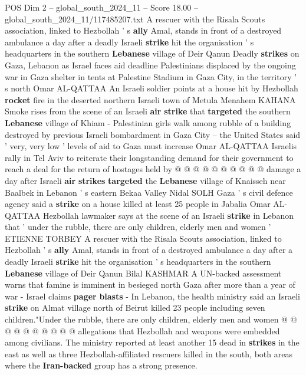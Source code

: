 \begin{textsample}{POS Dim 2 – global\_south\_2024\_11 – Score 18.00 – global\_south\_2024\_11/117485207.txt}  \label{ex:f2_pos_178}
A rescuer with the Risala Scouts association, linked to Hezbollah ' s \textbf{ally} Amal, stands in front of a destroyed ambulance a day after a deadly Israeli \textbf{strike} hit the organisation ' s headquarters in the southern \textbf{Lebanese} village of Deir Qanun Deadly \textbf{strikes} on Gaza, Lebanon as Israel faces aid deadline Palestinians displaced by the ongoing war in Gaza shelter in tents at Palestine Stadium in Gaza City, in the territory ' s north Omar AL-QATTAA An Israeli soldier points at a house hit by Hezbollah \textbf{rocket} fire in the deserted northern Israeli town of Metula Menahem KAHANA Smoke rises from the scene of an Israeli \textbf{air} \textbf{strike} that \textbf{targeted} the southern \textbf{Lebanese} village of Khiam - Palestinian girls walk among rubble of a building destroyed by previous Israeli bombardment in Gaza City -- the United States said ' very, very low ' levels of aid to Gaza must increase Omar AL-QATTAA Israelis rally in Tel Aviv to reiterate their longstanding demand for their government to reach a deal for the return of hostages held by @ @ @ @ @ @ @ @ @ @ damage a day after Israeli \textbf{air} \textbf{strikes} \textbf{targeted} the \textbf{Lebanese} village of Knaisseh near Baalbek in Lebanon ' s eastern Bekaa Valley Nidal SOLH Gaza ' s civil defence agency said a \textbf{strike} on a house killed at least 25 people in Jabalia Omar AL-QATTAA Hezbollah lawmaker says at the scene of an Israeli \textbf{strike} in Lebanon that ' under the rubble, there are only children, elderly men and women ' ETIENNE TORBEY A rescuer with the Risala Scouts association, linked to Hezbollah ' s \textbf{ally} Amal, stands in front of a destroyed ambulance a day after a deadly Israeli \textbf{strike} hit the organisation ' s headquarters in the southern \textbf{Lebanese} village of Deir Qanun Bilal KASHMAR A UN-backed assessment warns that famine is imminent in besieged north Gaza after more than a year of war - Israel claims \textbf{pager} \textbf{blasts} - In Lebanon, the health ministry said an Israeli \textbf{strike} on Almat village north of Beirut killed 23 people including seven children."Under the rubble, there are only children, elderly men and women @ @ @ @ @ @ @ @ @ @ allegations that Hezbollah and weapons were embedded among civilians.
The ministry reported at least another 15 dead in \textbf{strikes} in the east as well as three Hezbollah-affiliated rescuers killed in the south, both areas where the \textbf{Iran-backed} group has a strong presence.

\end{textsample}
